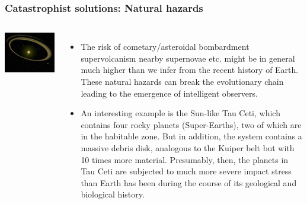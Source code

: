 \begin{frame}
\frametitle{Catastrophist solutions: Natural hazards}

\begin{columns}
\includegraphics[scale=0.25]{tauceti}

\begin{itemize}
\item The risk of cometary/asteroidal bombardment supervolcanism
nearby supernovae etc. might be in general much
higher than we infer from the recent history of
Earth. These natural hazards can break the evolutionary chain leading
to the emergence of intelligent observers.
\item An interesting example is the Sun-like Tau Ceti, which contains four rocky planets (Super-Earths), two of which are in the habitable zone. But in addition, the system contains 
 a massive debris disk, analogous to the Kuiper belt but with 10 times more material. Presumably, then, the planets in Tau Ceti are subjected to much more severe impact
stress than Earth has been during the course
of its geological and biological history.
\end{itemize}
\end{columns}

\end{frame}

